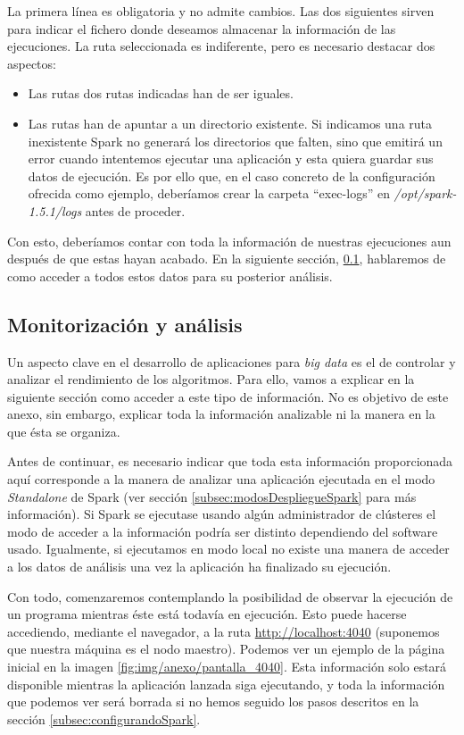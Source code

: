 La primera línea es obligatoria y no admite cambios. Las dos siguientes sirven para indicar el fichero donde deseamos almacenar la información de las ejecuciones. La ruta seleccionada es indiferente, pero es necesario destacar dos aspectos:
\begin{itemize}
\item Las rutas dos rutas indicadas han de ser iguales.
\item Las rutas han de apuntar a un directorio existente. Si indicamos una ruta inexistente Spark no generará los directorios que falten, sino que emitirá un error cuando intentemos ejecutar una aplicación y esta quiera guardar sus datos de ejecución. Es por ello que, en el caso concreto de la configuración ofrecida como ejemplo, deberíamos crear la carpeta ``exec-logs'' en  \textit{/opt/spark-1.5.1/logs} antes de proceder.
\end{itemize}

Con esto, deberíamos contar con toda la información de nuestras ejecuciones aun después de que estas hayan acabado. En la siguiente sección, \ref{subsec:monitorizacion}, hablaremos de como acceder a todos estos datos para su posterior análisis.


\subsection{Monitorización y análisis}\label{subsec:monitorizacion}

Un aspecto clave en el desarrollo de aplicaciones para \textit{big data} es el de controlar y analizar el rendimiento de los algoritmos. Para ello, vamos a explicar en la siguiente sección como acceder a este tipo de información. No es objetivo de este anexo, sin embargo, explicar toda la información analizable ni la manera en la que ésta se organiza.

Antes de continuar, es necesario indicar que toda esta información proporcionada aquí corresponde a la manera de analizar una aplicación ejecutada en el modo \textit{Standalone} de Spark (ver sección \ref{subsec:modosDespliegueSpark} para más información). Si Spark se ejecutase usando algún administrador de clústeres el modo de acceder a la información podría ser distinto dependiendo del software usado. Igualmente, si ejecutamos en modo local no existe una manera de acceder a los datos de análisis una vez la aplicación ha finalizado su ejecución.

Con todo, comenzaremos contemplando la posibilidad de observar la ejecución de un programa mientras éste está todavía en ejecución. Esto puede hacerse accediendo, mediante el navegador, a la ruta \url{http://localhost:4040} (suponemos que nuestra máquina es el nodo maestro). Podemos ver un ejemplo de la página inicial en la imagen \ref{fig:img/anexo/pantalla_4040}. Esta información solo estará disponible mientras la aplicación lanzada siga ejecutando, y toda la información que podemos ver será borrada si no hemos seguido los pasos descritos en la sección \ref{subsec:configurandoSpark}.

